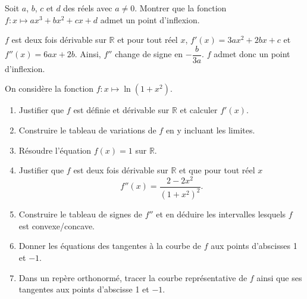\documentclass[11pt,fleqn, openany]{book} %
\begin{document}
\begin{exercise}[topic=cvx02]Soit $a$, $b$, $c$ et $d$ des réels avec $a \neq 0$. Montrer que la fonction $f:x\mapsto ax^3+bx^2+cx+d$ admet un point d'inflexion.\end{exercise}

\begin{solution}$f$ est deux fois dérivable sur $\mathbb{R}$ et pour tout réel $x$, $f'(x)=3ax^2+2bx+c$ et $f''(x)=6ax+2b$. Ainsi, $f''$ change de signe en $-\dfrac{b}{3a}$. $f$ admet donc un point d'inflexion.\end{solution}



\begin{exercise}[topic=cvx02]On considère la fonction $f:x\mapsto \ln(1+x^2)$.
\begin{enumerate}
\item Justifier que $f$ est définie et dérivable sur $\mathbb{R}$ et calculer $f'(x)$.
\item Construire le tableau de variations de $f$ en y incluant les limites.
\item Résoudre l'équation $f(x)=1$ sur $\mathbb{R}$.
\item Justifier que $f$ est deux fois dérivable sur $\mathbb{R}$ et que pour tout réel $x$
\[ f''(x)= \dfrac{2-2x^2}{(1+x^2)^2}.\]
\item Construire le tableau de signes de $f''$ et en déduire les intervalles lesquels $f$ est convexe/concave.
\item Donner les équations des tangentes à la courbe de $f$ aux points d'abscisses 1 et $-1$.
\item Dans un repère orthonormé, tracer la courbe représentative de $f$ ainsi que ses tangentes aux points d'abscisse 1 et $-1$.
\end{enumerate}\end{exercise}
\end{document}
